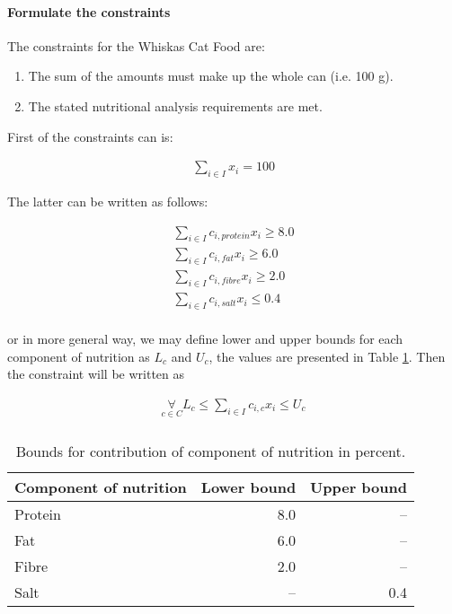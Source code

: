 \paragraph{Formulate the constraints}

The constraints for the Whiskas Cat Food are:

\begin{enumerate}
  \item The sum of the amounts must make up the whole can (i.e. 100 g).
  \item The stated nutritional analysis requirements are met.
\end{enumerate}

First of the constraints can is: 

\begin{align}
   \mathop\sum\limits_{i \in I} x_i = 100
\end{align}

The latter can be written as follows:

\begin{align}
   \mathop\sum\limits_{i \in I} c_{i,protein} x_i \geq 8.0 \\
   \mathop\sum\limits_{i \in I} c_{i,fat} x_i \geq 6.0 \\
   \mathop\sum\limits_{i \in I} c_{i,fibre} x_i \geq 2.0 \\ 
   \mathop\sum\limits_{i \in I} c_{i,salt} x_i \leq 0.4 \\
\end{align}

or in more general way, we may define lower and upper bounds for each component of nutrition as $L_c$ and $U_c$, the values are presented in Table \ref{ampl:whiskas:bounds}. Then the constraint will be written as

\begin{align}
   \mathop\forall\limits_{c \in C} L_c \leq \mathop\sum\limits_{i \in I} c_{i,c} x_i \leq U_c \\
\end{align}

\begin{table}
  \centering
  \begin{tabular}{| l | r | r |}
    \hline
    \textbf{Component of nutrition} & \textbf{Lower bound} & \textbf{Upper bound} \\ \hline
    Protein & 8.0 & -- \\ \hline
    Fat & 6.0 & -- \\ \hline
    Fibre & 2.0 & -- \\ \hline
    Salt & -- & 0.4 \\ \hline
  \end{tabular}
  \caption{Bounds for contribution of component of nutrition in percent.}
  \label{ampl:whiskas:bounds}  
\end{table}



